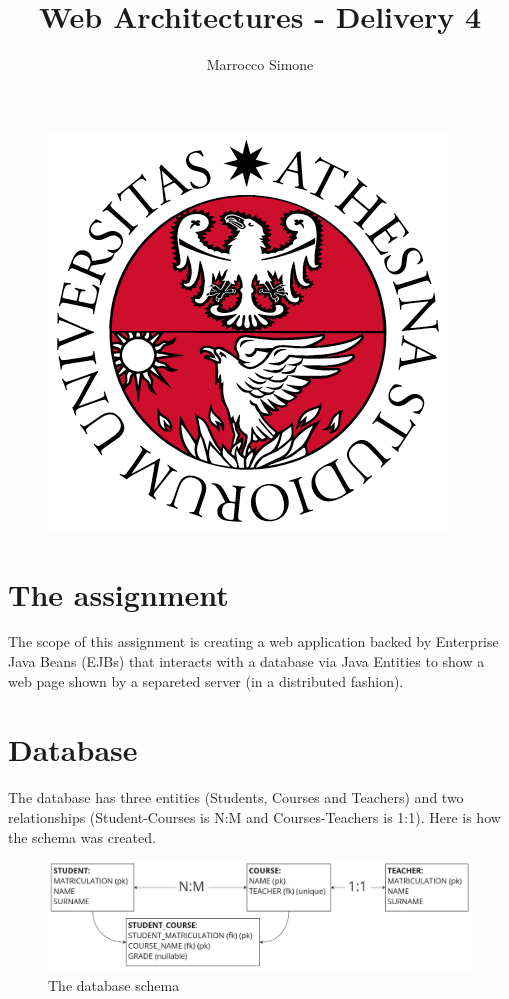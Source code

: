 \documentclass[12pt, a4paper]{article}
\title{Web Architectures - Delivery 4}
\author{Marrocco Simone}
\begin{document}
  \maketitle
  \begin{figure}[H]
    \centering
    \includegraphics[scale=0.35]{unitn.png}
  \end{figure}
  \tableofcontents
  \pagebreak

  \section{The assignment}

  The scope of this assignment is creating a web application backed by Enterprise Java Beans (EJBs) that interacts with a database via Java Entities to show a web page shown by a separeted server (in a distributed fashion).

  \section{Database}

  The database has three entities (Students, Courses and Teachers) and two relationships (Student-Courses is N:M and Courses-Teachers is 1:1). Here is how the schema was created.

  \begin{figure}[H]
    \centering
    \includegraphics[width=\columnwidth]{db_schema.png}
    \caption{The database schema}
  \end{figure}
\end{document}
